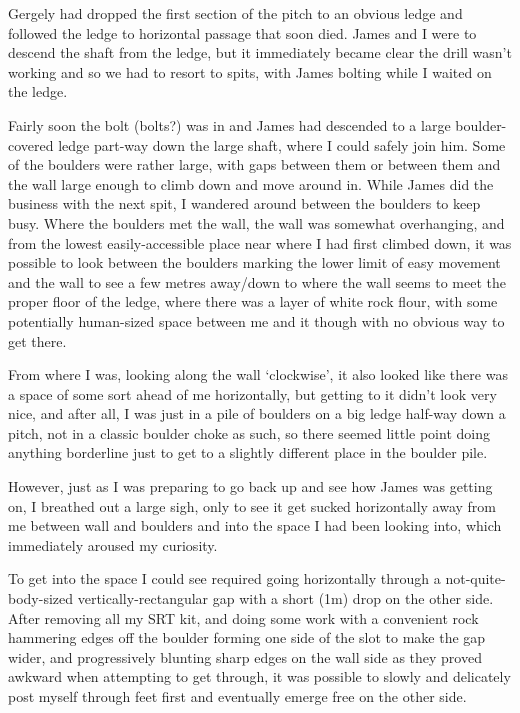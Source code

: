 Gergely had dropped the first section of the pitch to an obvious ledge
and followed the ledge to horizontal passage that soon died. James and I
were to descend the shaft from the ledge, but it immediately became
clear the drill wasn't working and so we had to resort to spits, with
James bolting while I waited on the ledge.

Fairly soon the bolt (bolts?) was in and James had descended to a large
boulder-covered ledge part-way down the large shaft, where I could
safely join him. Some of the boulders were rather large, with gaps
between them or between them and the wall large enough to climb down and
move around in. While James did the business with the next spit, I
wandered around between the boulders to keep busy. Where the boulders
met the wall, the wall was somewhat overhanging, and from the lowest
easily-accessible place near where I had first climbed down, it was
possible to look between the boulders marking the lower limit of easy
movement and the wall to see a few metres away/down to where the wall
seems to meet the proper floor of the ledge, where there was a layer of
white rock flour, with some potentially human-sized space between me and
it though with no obvious way to get there.

From where I was, looking along the wall `clockwise', it also looked
like there was a space of some sort ahead of me horizontally, but
getting to it didn't look very nice, and after all, I was just in a pile
of boulders on a big ledge half-way down a pitch, not in a classic
boulder choke as such, so there seemed little point doing anything
borderline just to get to a slightly different place in the boulder
pile.

However, just as I was preparing to go back up and see how James was
getting on, I breathed out a large sigh, only to see it get sucked
horizontally away from me between wall and boulders and into the space I
had been looking into, which immediately aroused my curiosity.

To get into the space I could see required going horizontally through a
not-quite-body-sized vertically-rectangular gap with a short (1m) drop
on the other side. After removing all my SRT kit, and doing some work
with a convenient rock hammering edges off the boulder forming one side
of the slot to make the gap wider, and progressively blunting sharp
edges on the wall side as they proved awkward when attempting to get
through, it was possible to slowly and delicately post myself through
feet first and eventually emerge free on the other side.

